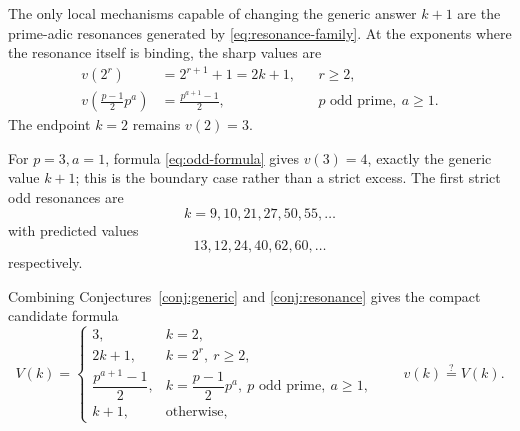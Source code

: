 \documentclass[../Axiomathic.tex]{subfiles}
\begin{document}
\begin{conj}\label{conj:resonance}
The only local mechanisms capable of changing the generic answer $k+1$ are the prime-adic resonances generated by \eqref{eq:resonance-family}.  At the exponents where the resonance itself is binding, the sharp values are
\begin{align}
  v(2^r)&=2^{r+1}+1=2k+1,
       &&r\ge2, \label{eq:two-formula}\\
  v\!\left(\frac{p-1}{2}p^a\right)
       &=\frac{p^{a+1}-1}{2},
       &&p\text{ odd prime},\ a\ge1. \label{eq:odd-formula}
\end{align}
The endpoint $k=2$ remains $v(2)=3$.
\end{conj}

For $p=3,a=1$, formula \eqref{eq:odd-formula} gives $v(3)=4$, exactly the generic value $k+1$; this is the boundary case rather than a strict excess.  The first strict odd resonances are
\[
  k=9,10,21,27,50,55,\ldots
\]
with predicted values
\[
  13,12,24,40,62,60,\ldots
\]
respectively.

Combining Conjectures~\ref{conj:generic} and \ref{conj:resonance} gives the compact candidate formula
\begin{equation}\label{eq:candidate-formula}
V(k)=
\begin{cases}
3,&k=2,\\
2k+1,&k=2^r,\ r\ge2,\\[1mm]
\dfrac{p^{a+1}-1}{2},&k=\dfrac{p-1}{2}p^a,\ p\text{ odd prime},\ a\ge1,\\[2mm]
k+1,&\text{otherwise},
\end{cases}
\qquad
\boxed{v(k)\stackrel?=V(k).}
\end{equation}
\end{document}
